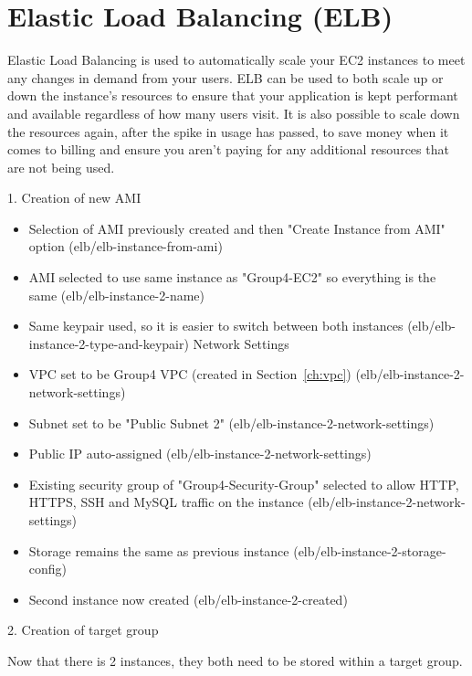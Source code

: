 \chapter{Elastic Load Balancing (ELB)}\label{ch:elastic-load-balancing}

Elastic Load Balancing is used to automatically scale your EC2 instances to meet any changes in demand from your users.
ELB can be used to both scale up or down the instance's resources to ensure that your application is kept performant and
available regardless of how many users visit.
It is also possible to scale down the resources again, after the spike in usage has passed, to save money when it comes
to billing and ensure you aren't paying for any additional resources that are not being used.

1. Creation of new AMI

\begin{itemize}
    \item Selection of AMI previously created and then "Create Instance from AMI" option (elb/elb-instance-from-ami)
    \item AMI selected to use same instance as "Group4-EC2" so everything is the same (elb/elb-instance-2-name)
    \item Same keypair used, so it is easier to switch between both instances (elb/elb-instance-2-type-and-keypair)
    Network Settings
    \item VPC set to be Group4 VPC  (created in Section~\ref{ch:vpc}) (elb/elb-instance-2-network-settings)
    \item Subnet set to be "Public Subnet 2" (elb/elb-instance-2-network-settings)
    \item Public IP auto-assigned (elb/elb-instance-2-network-settings)
    \item Existing security group of "Group4-Security-Group" selected to allow HTTP, HTTPS, SSH and MySQL traffic on the
    instance (elb/elb-instance-2-network-settings)
    \item Storage remains the same as previous instance (elb/elb-instance-2-storage-config)
    \item Second instance now created (elb/elb-instance-2-created)
\end{itemize}

2. Creation of target group

Now that there is 2 instances, they both need to be stored within a target group.

